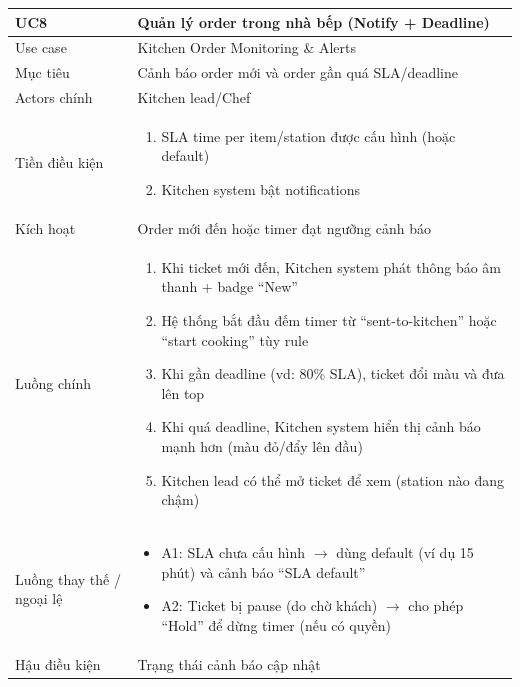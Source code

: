 \begin{longtable}{|>{\raggedright\arraybackslash}p{}|>{\raggedright\arraybackslash}p{}|}
\hline
\textbf{UC8} & \textbf{Quản lý order trong nhà bếp (Notify + Deadline)} \\
\hline
Use case & Kitchen Order Monitoring \& Alerts \\
\hline
Mục tiêu & Cảnh báo order mới và order gần quá SLA/deadline \\
\hline
Actors chính & Kitchen lead/Chef \\
\hline
Tiền điều kiện &
\vspace{-0.5em}
\begin{enumerate}[leftmargin=*]
\item SLA time per item/station được cấu hình (hoặc default)
\item Kitchen system bật notifications
\end{enumerate}
\vspace{-0.5em}
\\
\hline
Kích hoạt & Order mới đến hoặc timer đạt ngưỡng cảnh báo \\
\hline
Luồng chính &
\vspace{-0.5em}
\begin{enumerate}[leftmargin=*]
\item Khi ticket mới đến, Kitchen system phát thông báo âm thanh + badge “New”
\item Hệ thống bắt đầu đếm timer từ “sent-to-kitchen” hoặc “start cooking” tùy rule
\item Khi gần deadline (vd: 80\% SLA), ticket đổi màu và đưa lên top
\item Khi quá deadline, Kitchen system hiển thị cảnh báo mạnh hơn (màu đỏ/đẩy lên đầu)
\item Kitchen lead có thể mở ticket để xem (station nào đang chậm)
\end{enumerate}
\vspace{-0.5em}
\\
\hline
Luồng thay thế / ngoại lệ &
\vspace{-0.5em}
\begin{itemize}[leftmargin=*]
\item A1: SLA chưa cấu hình $\rightarrow$ dùng default (ví dụ 15 phút) và cảnh báo “SLA default”
\item A2: Ticket bị pause (do chờ khách) $\rightarrow$ cho phép “Hold” để dừng timer (nếu có quyền)
\end{itemize}
\vspace{-0.5em}
\\
\hline
Hậu điều kiện & Trạng thái cảnh báo cập nhật \\
\hline
\end{longtable}

